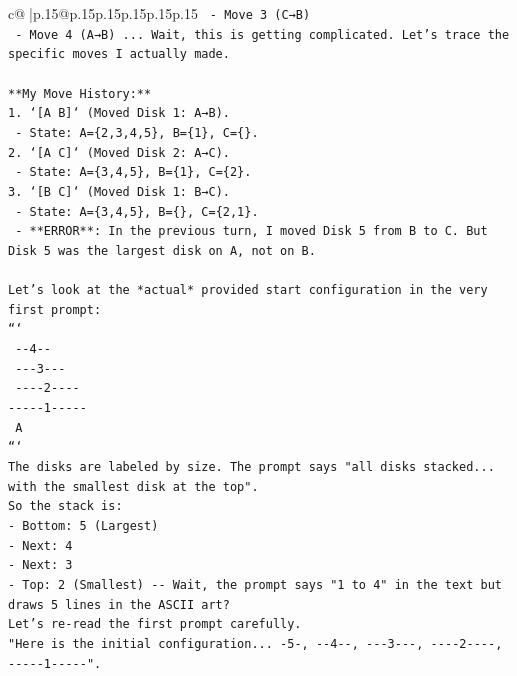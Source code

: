 \documentclass{article}
\begin{document}
{\begin{supertabular}{c@{$\;$}|p{.15\linewidth}@{}p{.15\linewidth}p{.15\linewidth}p{.15\linewidth}p{.15\linewidth}p{.15\linewidth}}
{{{\texttt{   {-} Move 3 (C→B)} \\
\texttt{   {-} Move 4 (A→B) ... Wait, this is getting complicated. Let's trace the specific moves I actually made.} \\
\\ 
\texttt{**My Move History:**} \\
\texttt{1. `{[}A B{]}` (Moved Disk 1: A→B).} \\
\texttt{   {-} State: A=\{2,3,4,5\}, B=\{1\}, C=\{\}.} \\
\texttt{2. `{[}A C{]}` (Moved Disk 2: A→C).} \\
\texttt{   {-} State: A=\{3,4,5\}, B=\{1\}, C=\{2\}.} \\
\texttt{3. `{[}B C{]}` (Moved Disk 1: B→C).} \\
\texttt{   {-} State: A=\{3,4,5\}, B=\{\}, C=\{2,1\}.} \\
\texttt{   {-} **ERROR**: In the previous turn, I moved Disk 5 from B to C. But Disk 5 was the largest disk on A, not on B.} \\
\\ 
\texttt{Let's look at the *actual* provided start configuration in the very first prompt:} \\
\texttt{```} \\
\texttt{   {-}{-}4{-}{-}} \\
\texttt{  {-}{-}{-}3{-}{-}{-}} \\
\texttt{ {-}{-}{-}{-}2{-}{-}{-}{-}} \\
\texttt{{-}{-}{-}{-}{-}1{-}{-}{-}{-}{-}} \\
\texttt{     A} \\
\texttt{```} \\
\texttt{The disks are labeled by size. The prompt says "all disks stacked... with the smallest disk at the top".} \\
\texttt{So the stack is:} \\
\texttt{{-} Bottom: 5 (Largest)} \\
\texttt{{-} Next: 4} \\
\texttt{{-} Next: 3} \\
\texttt{{-} Top: 2 (Smallest) {-}{-} Wait, the prompt says "1 to 4" in the text but draws 5 lines in the ASCII art?} \\
\texttt{Let's re{-}read the first prompt carefully.} \\
\texttt{"Here is the initial configuration... {-}5{-}, {-}{-}4{-}{-}, {-}{-}{-}3{-}{-}{-}, {-}{-}{-}{-}2{-}{-}{-}{-}, {-}{-}{-}{-}{-}1{-}{-}{-}{-}{-}".} \\
}}}
\end{supertabular}}
\end{document}

